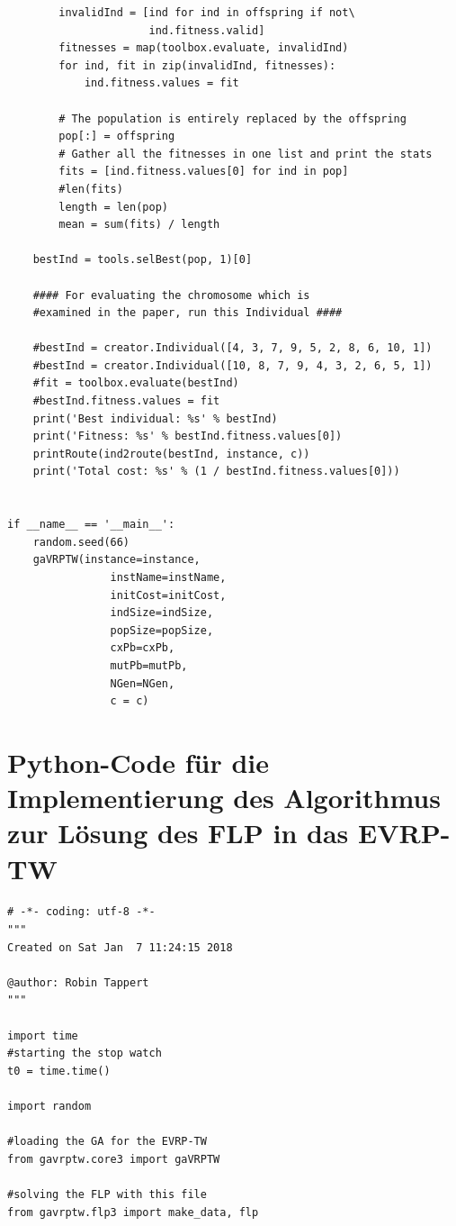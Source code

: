 \documentclass[a4paper,12pt,parskip,bibtotoc,liststotoc]{article}
\begin{document}
\begin{appendix}
\begin{lstlisting}
        invalidInd = [ind for ind in offspring if not\
                      ind.fitness.valid]       
        fitnesses = map(toolbox.evaluate, invalidInd)
        for ind, fit in zip(invalidInd, fitnesses):
            ind.fitness.values = fit
            
        # The population is entirely replaced by the offspring
        pop[:] = offspring
        # Gather all the fitnesses in one list and print the stats
        fits = [ind.fitness.values[0] for ind in pop]
        #len(fits)
        length = len(pop)
        mean = sum(fits) / length
        
    bestInd = tools.selBest(pop, 1)[0]
    
    #### For evaluating the chromosome which is
    #examined in the paper, run this Individual ####
    
    #bestInd = creator.Individual([4, 3, 7, 9, 5, 2, 8, 6, 10, 1])
    #bestInd = creator.Individual([10, 8, 7, 9, 4, 3, 2, 6, 5, 1])
    #fit = toolbox.evaluate(bestInd)
    #bestInd.fitness.values = fit
    print('Best individual: %s' % bestInd)
    print('Fitness: %s' % bestInd.fitness.values[0])
    printRoute(ind2route(bestInd, instance, c))
    print('Total cost: %s' % (1 / bestInd.fitness.values[0]))


if __name__ == '__main__':
    random.seed(66)
    gaVRPTW(instance=instance,
                instName=instName,
                initCost=initCost,
                indSize=indSize,
                popSize=popSize,
                cxPb=cxPb,
                mutPb=mutPb,
                NGen=NGen,
                c = c)
\end{lstlisting}


\section{Python-Code für die Implementierung des Algorithmus zur Lösung des FLP in das EVRP-TW}

\begin{lstlisting}
# -*- coding: utf-8 -*-
"""
Created on Sat Jan  7 11:24:15 2018

@author: Robin Tappert
"""

import time
#starting the stop watch
t0 = time.time()

import random

#loading the GA for the EVRP-TW
from gavrptw.core3 import gaVRPTW

#solving the FLP with this file
from gavrptw.flp3 import make_data, flp



\end{lstlisting}
\end{appendix}
\end{document}
